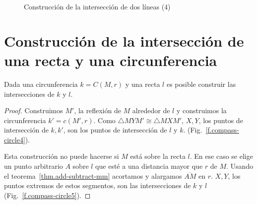 \begin{figure}%
\begin{center}
\end{center}
\caption{Construcción de la intersección de dos líneas (4)}\label{f.compass-intersection4}
\end{figure}


\section[La intersección de una recta y una circunferencia]
{Construcción de la intersección de una recta y una circunferencia}\label{s.line-circle}

\begin{theorem}
Dada una circunferencia $k=C(M,r)$ y una recta $l$ es posible construir las intersecciones de $k$ y $l$.
\end{theorem}

\begin{proof}
Construimos $M'$, la reflexión de $M$ alrededor de $l$ y construimos la circunferencia $k'=c(M',r)$. Como $\triangle MYM'\cong\triangle MXM'$, $X,Y$, los puntos de intersección de $k,k'$, son los puntos de intersección de $l$ y $k$. (Fig.~\ref{f.compass-circle4}).

Esta construcción no puede hacerse si $M$ está sobre la recta $l$. En ese caso se elige un punto arbitrario $A$ sobre $l$ que esté a una distancia mayor que $r$ de $M$. Usando el teorema~\ref{thm.add-subtract-mm} acortamos y alargamos $\overline{AM}$ en $r$. $X,Y$, los puntos extremos de estos segmentos, son las intersecciones de $k$ y $l$ (Fig.~\ref{f.compass-circle5}).
\end{proof}

